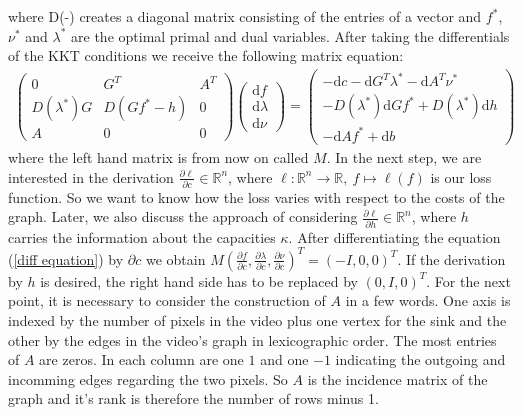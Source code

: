 \documentclass{article}
\begin{document}
where D(-) creates a diagonal matrix consisting of the entries of a vector and $f^*$, $\nu^*$ and $\lambda^*$ are the optimal primal and dual variables. After taking the differentials of the KKT conditions we receive the following matrix equation:
\begin{align}
\begin{pmatrix} 0 & G^T & A^T \\ D(\lambda^*) G & D(Gf^* -h) & 0 \\ A & 0 & 0 \end{pmatrix}
\begin{pmatrix} \mathrm{d} f \\ \mathrm{d} \lambda \\ \mathrm{d} \nu \end{pmatrix} = 
\begin{pmatrix} -\mathrm{d}c - \mathrm{d}G^T \lambda^* -\mathrm{d}A^T\nu^* \\ 
-D(\lambda^*)\mathrm d G f^* + D(\lambda^*)\mathrm d h \\
-\mathrm d A f^* + \mathrm d b \end{pmatrix} \label{diff equation}
\end{align}
where the left hand matrix is from now on called $M$.
In the next step, we are interested in the derivation $\frac{\partial \ell}{\partial c}\in \mathbb R ^n$, where $\ell: \mathbb{R}^n \rightarrow \mathbb R,~f\mapsto \ell(f) $ is our loss function. So we want to know how the loss varies with respect to the costs of the graph. Later, we also discuss the approach of considering $\frac{\partial \ell}{\partial h}\in \mathbb R^n$, where $h$ carries the information about the capacities $\kappa$. After differentiating the equation (\ref*{diff equation}) by $\partial c$ we obtain
$M (\frac{\partial f}{\partial c}, \frac{\partial\lambda}{\partial c}, \frac{\partial \nu}{\partial c})^T
= ( -I, 0, 0 )^T.$
If the derivation by $h$ is desired, the right hand side has to be replaced by $(0, I, 0)^T$.
For the next point, it is necessary to consider the construction of $A$ in a few words. One axis is indexed by the number of pixels in the video plus one vertex for the sink and the other by the edges in the video's graph in lexicographic order. The most entries of $A$ are zeros. In each column are one $1$ and one $-1$ indicating the outgoing and incomming edges regarding the two pixels. So $A$ is the incidence matrix of the graph and it's rank is therefore the number of rows minus 1.\\
\end{document}
